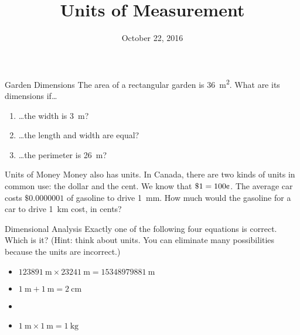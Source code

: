 \documentclass[14pt,letterpaper]{article}
\title{Units of Measurement}
\date{October 22, 2016}
\begin{document}
\HomeworkTitle

\thispagestyle{empty}

\begin{problem}{Garden Dimensions}
 The area of a rectangular garden is \SI{36}{\metre\squared}. What are its
 dimensions if\ldots

 \begin{enumerate}[\hspace{1cm}a.]
   \item \ldots{}the width is \SI{3}{\metre}?
   \item \ldots{}the length and width are equal?
   \item \ldots{}the perimeter is \SI{26}{\metre}?
 \end{enumerate}
\end{problem}

\begin{problem}{Units of Money}
  Money also has units. In Canada, there are two kinds of units in common use:
  the dollar and the cent. We know that $\$1=100\text{\textcent}$. The average
  car costs $\$0.0000001$ of gasoline to drive \SI{1}{\milli\metre}. How much
  would the gasoline for a car to drive \SI{1}{\kilo\metre} cost, in cents?
  \hfill {}
\end{problem}

\begin{problem}{Dimensional Analysis}
  Exactly one of the following four equations is correct. Which is it? (Hint:
  think about units. You can eliminate many possibilities because the units
  are incorrect.)

  \begin{itemize}
    \item \(\SI{123891}{\metre} \times \SI{23241}{\metre}
    = \SI{15348979881}{\metre}\)
    \item \(\SI{1}{\metre} + \SI{1}{\metre} = \SI{2}{\centi\metre}\)
    \item {}
    \item \(\SI{1}{\metre} \times \SI{1}{\metre} = \SI{1}{\kilo\gram}\)
  \end{itemize}
\end{problem}
\end{document}

